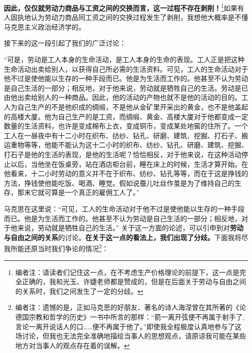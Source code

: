 \documentclass[a4paper,twoside,12pt,AutoFakeBold]{ctexart}
\begin{document}
\textbf{因此，仅仅就劳动力商品与工资之间的交换而言，这一过程不存在剥削！}\footnote{编者注：请读者们记住这一点，在不考虑生产价格理论的前提下，这一点是完全正确的，我和光玉、许婕老师都是赞成的，但是在后面关于劳动与自由之间的关系时，我们之间发生了一定的分歧。}如果有人固执地认为劳动力商品同工资之间的交换过程发生了剥削，我想他大概率是不懂马克思主义政治经济学的。

接下来的这一段引起了我们的广泛讨论：

\begin{adjustwidth}{2em}{2em}
    \qquad\fangsong
“可是，劳动是工人本身的生命活动，是工人本身的生命的表现。工人正是把这种生命活动出卖给别人，以获得自己所必需的生活资料。可见，工人的生命活动对于他不过是使他能以生存的一种手段而已。他是为生活而工作的。他甚至不认为劳动是自己生活的一部分；相反地，对于他来说，劳动就是牺牲自己的生活。劳动是已由他出卖给别人的一种商品。因此，他的活动的产物也就不是他的活动的目的。工人为自己生产的不是他织成的绸缎，不是他从金矿里开采出的黄金，也不是他盖起的高楼大厦。他为自己生产的是工资，而绸缎、黄金、高楼大厦对于他都变成一定数量的生活资料，也许是变成棉布上衣，变成铜币，变成某处地窖的住所了。一个工人在一昼夜中有十二小时在织布、纺纱、钻孔、研磨、建筑、挖掘、打石子、搬运重物等等，他能不能认为这十二小时的织布、纺纱、钻孔、研磨、建筑、挖掘、打石子是他的生活的表现，是他的生活呢？恰恰相反，对于他来说，在这种活动停止以后，当他坐在饭桌旁，站在酒店柜台前，睡在床上的时候，生活才算开始。在他看来，十二小时劳动的意义并不在于织布、纺纱、钻孔等等，而在于这是挣钱的方法，挣钱使他能吃饭、喝酒、睡觉。假如说蚕儿吐丝作茧是为了维持自己的生存，那末它就可算是一个真正的雇佣工人了。”
\end{adjustwidth}

马克思在这里说：“可见，工人的生命活动对于他不过是使他能以生存的一种手段而已。他是为生活而工作的。他甚至不认为劳动是自己生活的一部分；相反地，对于他来说，劳动就是牺牲自己的生活。”
关于这一方面的论述，可以引申到对\textbf{劳动与自由之间的关系}的讨论。\textbf{在关于这一点的看法上，我们出现了分歧。}下面我将尽我所能还原当时我们争论的情况\footnote{编者注：遗憾的是，正如马克思的好朋友、著名的诗人海涅曾在其所著的《论德国宗教和哲学的历史》一书中所言的那样：“箭一离开弦便不再属于射手了,言论一离开说话人的口……便不再属于他了。”即使我全程极度认真地参与了这场讨论，但我也无法完全准确地描绘当事人的思想观点，请原谅我可能在某些地方对当事人的观点存在着的误解。}：
\end{document}
